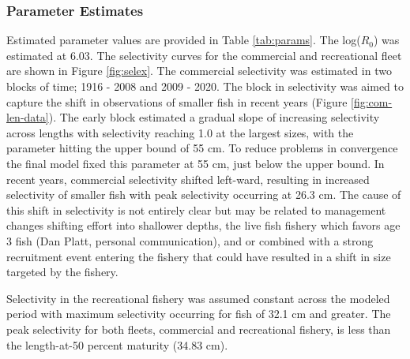 \documentclass[11pt,
  english,
  a4paper,
]{article}
\begin{document}
\leavevmode\tagmcend\tagstructend\par


\hypertarget{parameter-estimates}{%
\subsubsection{Parameter Estimates}\label{parameter-estimates}}

\leavevmode\tagmcend\tagstructend


Estimated parameter values are provided in Table \ref{tab:params}. The log({\(R_0\)\leavevmode\tagmcend\tagstructend}) was estimated at 6.03. The selectivity curves for the commercial and recreational fleet are shown in Figure \ref{fig:selex}. The commercial selectivity was estimated in two blocks of time; 1916 - 2008 and 2009 - 2020. The block in selectivity was aimed to capture the shift in observations of smaller fish in recent years (Figure \ref{fig:com-len-data}). The early block estimated a gradual slope of increasing selectivity across lengths with selectivity reaching 1.0 at the largest sizes, with the parameter hitting the upper bound of 55 cm. To reduce problems in convergence the final model fixed this parameter at 55 cm, just below the upper bound. In recent years, commercial selectivity shifted left-ward, resulting in increased selectivity of smaller fish with peak selectivity occurring at 26.3 cm. The cause of this shift in selectivity is not entirely clear but may be related to management changes shifting effort into shallower depths, the live fish fishery which favors age 3 fish (Dan Platt, personal communication), and or combined with a strong recruitment event entering the fishery that could have resulted in a shift in size targeted by the fishery.

\leavevmode\tagmcend\tagstructend\par


Selectivity in the recreational fishery was assumed constant across the modeled period with maximum selectivity occurring for fish of 32.1 cm and greater. The peak selectivity for both fleets, commercial and recreational fishery, is less than the length-at-50 percent maturity (34.83 cm).

\leavevmode\tagmcend\tagstructend\par
\end{document}
